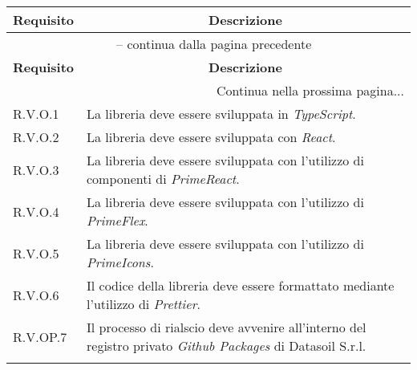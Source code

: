\begin{center}
    \begin{longtable}{|p{2.5cm}|p{10cm}|}
        \hline
        \rowcolor{gray!30}
        \textbf{Requisito} & \multicolumn{1}{c|}{\textbf{Descrizione}}                                                       \\
        \hline
        \endfirsthead
        \hline
        \multicolumn{2}{|c|}{{\tablename\ \thetable{} -- continua dalla pagina precedente}}                                  \\
        \hline
        \rowcolor{gray!30}
        \textbf{Requisito} & \multicolumn{1}{c|}{\textbf{Descrizione}}                                                       \\
        \endhead
        \hline
        \multicolumn{2}{|r|}{{Continua nella prossima pagina...}}                                                            \\
        \hline
        \endfoot
        \hline
        \endlastfoot
        \hline
        R.V.O.1            & La libreria deve essere sviluppata in \textit{TypeScript}.                                      \\
        \hline
        R.V.O.2            & La libreria deve essere sviluppata con \textit{React}.                                          \\
        \hline
        R.V.O.3            & La libreria deve essere sviluppata con l'utilizzo di componenti di \textit{PrimeReact}.         \\
        \hline
        R.V.O.4            & La libreria deve essere sviluppata con l'utilizzo di \textit{PrimeFlex}.                        \\
        \hline
        R.V.O.5            & La libreria deve essere sviluppata con l'utilizzo di \textit{PrimeIcons}.                       \\
        \hline
        R.V.O.6            & Il codice della libreria deve essere formattato mediante l'utilizzo di \textit{Prettier}.       \\
        \hline
        R.V.OP.7           & Il processo di rialscio deve avvenire all'interno del registro privato \textit{Github Packages}
        di Datasoil S.r.l.                                                                                                   \\                                                                                       \\
    \end{longtable}
    \label{tab:requisiti_vincolo}
\end{center}

